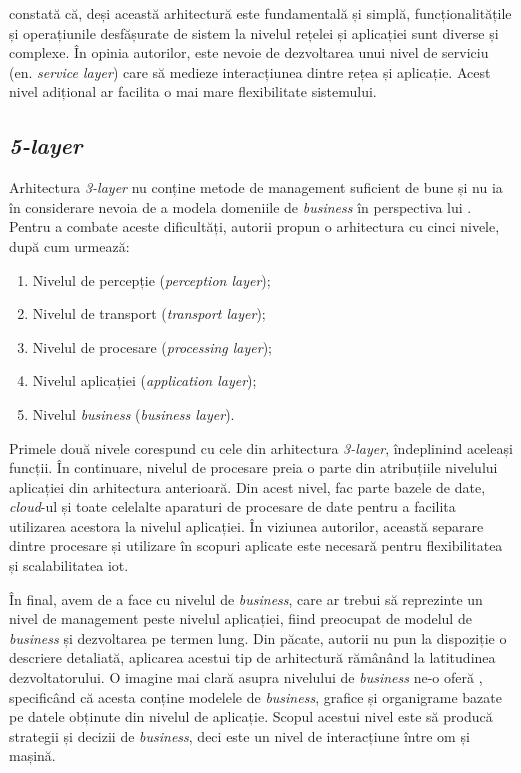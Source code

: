 \citet{Lin2017} constată că, deși această arhitectură este fundamentală și simplă, funcționalitățile și operațiunile desfășurate de sistem la nivelul rețelei și aplicației sunt diverse și complexe. În opinia autorilor, este nevoie de dezvoltarea unui nivel de serviciu (en. \textit{service layer}) care să medieze interacțiunea dintre rețea și aplicație. Acest nivel adițional ar facilita o mai mare flexibilitate sistemului.

\subsection*{\textit{5-layer}}

Arhitectura \textit{3-layer} nu conține metode de management suficient de bune și nu ia în considerare nevoia de a modela domeniile de \textit{business} în perspectiva lui \citet{MiaoWu2010}. Pentru a combate aceste dificultăți, autorii propun o arhitectura cu cinci nivele, după cum urmează:

\begin{enumerate}
    \item Nivelul de percepție (\textit{perception layer});
    \item Nivelul de transport (\textit{transport layer});
    \item Nivelul de procesare (\textit{processing layer});
    \item Nivelul aplicației (\textit{application layer});
    \item Nivelul \textit{business} (\textit{business layer}).
\end{enumerate}

Primele două nivele corespund cu cele din arhitectura \textit{3-layer}, îndeplinind aceleași funcții. În continuare, nivelul de procesare preia o parte din atribuțiile nivelului aplicației din arhitectura anterioară. Din acest nivel, fac parte bazele de date, \textit{cloud}-ul și toate celelalte aparaturi de procesare de date pentru a facilita utilizarea acestora la nivelul aplicației. În viziunea autorilor, această separare dintre procesare și utilizare în scopuri aplicate este necesară pentru flexibilitatea și scalabilitatea \acrshort{iot}.

În final, avem de a face cu nivelul de \textit{business}, care ar trebui să reprezinte un nivel de management peste nivelul aplicației, fiind preocupat de modelul de \textit{business} și dezvoltarea pe termen lung. Din păcate, autorii nu pun la dispoziție o descriere detaliată, aplicarea acestui tip de arhitectură rămânând la latitudinea dezvoltatorului. O imagine mai clară asupra nivelului de \textit{business} ne-o oferă \citet{Khan2012}, specificând că acesta conține modelele de \textit{business}, grafice și organigrame bazate pe datele obținute din nivelul de aplicație. Scopul acestui nivel este să producă strategii și decizii de \textit{business}, deci este un nivel de interacțiune între om și mașină.

